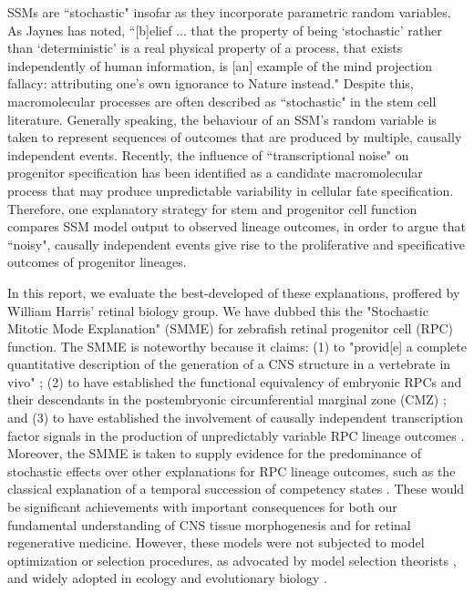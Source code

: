 SSMs are ``stochastic" insofar as they incorporate parametric random variables. As Jaynes has noted, ``[b]elief ... that the property of being ‘stochastic' rather than ‘deterministic' is a real physical property of a process, that exists independently of human information, is [an] example of the mind projection fallacy: attributing one’s own ignorance to Nature instead." \cite[pp.506]{Jaynes2003} Despite this, macromolecular processes are often described as ``stochastic" in the stem cell literature. Generally speaking, the behaviour of an SSM's random variable is taken to represent sequences of outcomes that are produced by multiple, causally independent events. Recently, the influence of ``transcriptional noise" on progenitor specification has been identified as a candidate macromolecular process that may produce unpredictable variability in cellular fate specification. Therefore, one explanatory strategy for stem and progenitor cell function compares SSM model output to observed lineage outcomes, in order to argue that ``noisy", causally independent events give rise to the proliferative and specificative outcomes of progenitor lineages.

In this report, we evaluate the best-developed of these explanations, proffered by William Harris' retinal biology group. We have dubbed this the "Stochastic Mitotic Mode Explanation" (SMME) for zebrafish retinal progenitor cell (RPC) function. The SMME is noteworthy because it claims: (1) to "provid[e] a complete quantitative description of the generation of a CNS structure in a vertebrate in vivo" \cite{He2012}; (2) to have established the functional equivalency of embryonic RPCs and their descendants in the postembryonic circumferential marginal zone (CMZ) \cite{Wan2016}; and (3) to have established the involvement of causally independent transcription factor signals in the production of unpredictably variable RPC lineage outcomes \cite{Boije2015}. Moreover, the SMME is taken to supply evidence for the predominance of stochastic effects over other explanations for RPC lineage outcomes, such as the classical explanation of a temporal succession of competency states \cite{Temple1986}. These would be significant achievements with important consequences for both our fundamental understanding of CNS tissue morphogenesis and for retinal regenerative medicine. However, these models were not subjected to model optimization or selection procedures, as advocated by model selection theorists \cite{Burnham2002}, and widely adopted in ecology and evolutionary biology \cite{Johnson2004}.

